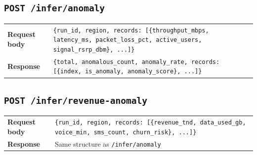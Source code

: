 \subsection{\texttt{POST /infer/anomaly}}

\begin{tabularx}{\textwidth}{@{}lX@{}}
\toprule
\textbf{Request body} & \texttt{\{run\_id, region, records: [\{throughput\_mbps, latency\_ms, packet\_loss\_pct, active\_users, signal\_rsrp\_dbm\}, ...]\}} \\
\textbf{Response} & \texttt{\{total, anomalous\_count, anomaly\_rate, records: [\{index, is\_anomaly, anomaly\_score\}, ...]\}} \\
\bottomrule
\end{tabularx}

\subsection{\texttt{POST /infer/revenue-anomaly}}

\begin{tabularx}{\textwidth}{@{}lX@{}}
\toprule
\textbf{Request body} & \texttt{\{run\_id, region, records: [\{revenue\_tnd, data\_used\_gb, voice\_min, sms\_count, churn\_risk\}, ...]\}} \\
\textbf{Response} & Same structure as \texttt{/infer/anomaly} \\
\bottomrule
\end{tabularx}
